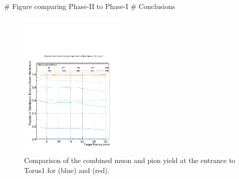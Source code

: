 \begin{easylist}
	# Figure comparing Phase-II to Phase-I
	# Conclusions
\end{easylist}

\begin{figure}[t]
\centering
\includegraphics[width=0.45\textwidth,trim=0 0 0 1.5cm,clip]{figs/optimisation/ProdTgtGeom/Radius_pi-minus_integral_ratios}
\caption{
Comparison of the combined muon and pion yield at the entrance to Torus1 for \phaseI (blue) and \phaseII (red).
}
\end{figure}

